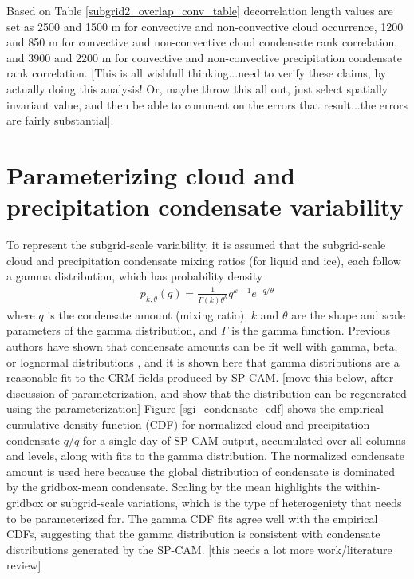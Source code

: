 Based on Table \ref{subgrid2_overlap_conv_table} decorrelation length values are set as 2500 and 1500 m for convective and non-convective cloud occurrence, 1200 and 850 m for convective and non-convective cloud condensate rank correlation, and 3900 and 2200 m for convective and non-convective precipitation condensate rank correlation. [This is all wishfull thinking...need to verify these claims, by actually doing this analysis! Or, maybe throw this all out, just select spatially invariant value, and then be able to comment on the errors that result...the errors are fairly substantial].

\section{Parameterizing cloud and precipitation condensate variability}
\label{subgrid2_variability_section}
To represent the subgrid-scale variability, it is assumed that the subgrid-scale cloud and precipitation condensate mixing ratios (for liquid and ice), each follow a gamma distribution, which has probability density
\begin{gather}
    p_{k, \theta}(q) = \frac{1}{\Gamma(k) \theta^k} q^{k - 1} e^{-q/\theta}
\end{gather}
where $q$ is the condensate amount (mixing ratio), $k$ and $\theta$ are the shape and scale parameters of the gamma distribution, and $\Gamma$ is the gamma function. Previous authors have shown that condensate amounts can be fit well with gamma, beta, or lognormal distributions \citep[e.g.,][]{lee_et_al_2010}, and it is shown here that gamma distributions are a reasonable fit to the CRM fields produced by SP-CAM. [move this below, after discussion of parameterization, and show that the distribution can be regenerated using the parameterization] Figure \ref{sgi_condensate_cdf} shows the empirical cumulative density function (CDF) for normalized cloud and precipitation condensate $q / \overline{q}$ for a single day of SP-CAM output, accumulated over all columns and levels, along with fits to the gamma distribution. The normalized condensate amount is used here because the global distribution of condensate is dominated by the gridbox-mean condensate. Scaling by the mean highlights the within-gridbox or subgrid-scale variations, which is the type of heterogeniety that needs to be parameterized for. The gamma CDF fits agree well with the empirical CDFs, suggesting that the gamma distribution is consistent with condensate distributions generated by the SP-CAM. [this needs a lot more work/literature review]

